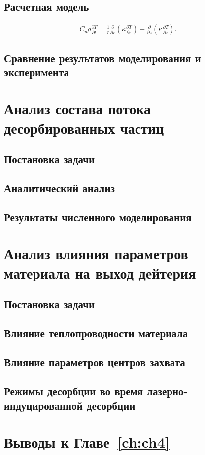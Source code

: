 \subsection{Расчетная модель}\label{subsec:ch4/sec1/subsec3}

\begin{align}
    C_p \rho \frac{\partial T}{\partial t} = \frac{1}{r}\frac{\partial}{\partial r}\left( \kappa \frac{\partial T}{\partial r} \right) + \frac{\partial }{\partial z}\left( \kappa \frac{\partial T}{\partial z} \right).
\end{align}

\subsection{Сравнение результатов моделирования и эксперимента}\label{subsec:ch4/sec1/subsec4}

\section{Анализ состава потока десорбированных частиц}\label{sec:ch4/sec2}
\subsection{Постановка задачи}\label{subsec:ch4/seс2/subsec1}
\subsection{Аналитический анализ}\label{subsec:ch4/seс2/subsec2}
\subsection{Результаты численного моделирования}\label{subsec:ch4/seс2/subsec3}

\section{Анализ влияния параметров материала на выход дейтерия}\label{sec:ch4/seс3}
\subsection{Постановка задачи}\label{subsec:ch4/seс3/subsec1}
\subsection{Влияние теплопроводности материала}\label{subsec:ch4/seс3/subsec2}
\subsection{Влияние параметров центров захвата}\label{subsec:ch4/seс3/subsec3}
\subsection{Режимы десорбции во время лазерно-индуцированной десорбции}\label{sec:ch4/seс4/subsec4}

\section{Выводы к Главе~\ref{ch:ch4}}

\clearpage
